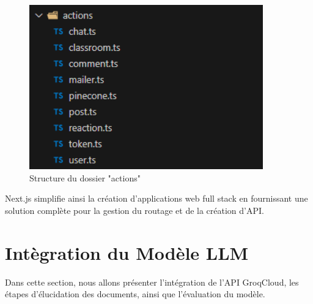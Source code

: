 \begin{figure}[H]
\begin{minipage}[b]{0.45\textwidth}
        \includegraphics[width=0.9\textwidth,height=0.9\textwidth]{images/chp5/fig3.png}
        \caption{Structure du dossier "actions"}
        \label{fig:Structure du dossier "actions"}
    \end{minipage}
\end{figure}


\noindent Next.js simplifie ainsi la création d'applications web full stack en fournissant une solution complète pour la gestion du routage et de la création d'API.


\section{Intègration du Modèle LLM}
Dans cette section, nous allons présenter l'intégration de l'API GroqCloud, les étapes d'élucidation des documents, ainsi que l'évaluation du modèle.

